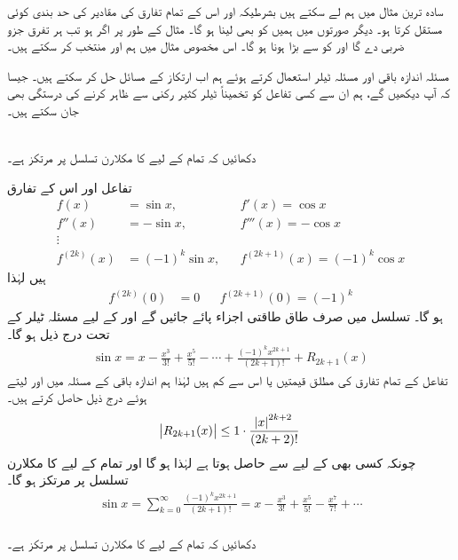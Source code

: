 سادہ ترین مثال میں ہم  لے سکتے ہیں بشرطیکہ  اور اس کے  تمام تفارق کی مقادیر کی حد  بندی کوئی مستقل   کرتا ہو۔ دیگر صورتوں میں ہمیں  کو بھی لینا ہو گا۔ مثال کے طور پر اگر  ہو تب ہر تفرق جزو ضربی  دے گا  اور  کو  سے بڑا  ہونا ہو گا۔ اس مخصوص مثال میں ہم  اور  منتخب کر سکتے ہیں۔

مسئلہ اندازہ باقی اور  مسئلہ ٹیلر استعمال کرتے ہوئے ہم اب ارتکاز کے مسائل حل کر سکتے ہیں۔ جیسا کہ  آپ دیکھیں گے، ہم ان سے کسی تفاعل کو تخمیناً ٹیلر کثیر رکنی سے ظاہر کرنے کی درستگی بھی جان سکتے ہیں۔

\\
دکھائیں کہ تمام  کے لیے  کا مکلارن تسلسل  پر مرتکز ہے۔

تفاعل اور اس کے تفارق
\begin{align*}
f(x)&=\sin x,&&f'(x)=\cos x\\
f''(x)&=-\sin x,&&f'''(x)=-\cos x\\
\vdots&\\
f^{(2k)}(x)&=(-1)^k\sin x,&&f^{(2k+1)}(x)=(-1)^k\cos x
\end{align*}
ہیں لہٰذا
\begin{align*}
f^{(2k)}(0)&=0&&f^{(2k+1)}(0)=(-1)^k
\end{align*}
ہو گا۔ تسلسل میں صرف طاق طاقتی اجزاء پائے جائیں گے اور  کے لیے مسئلہ ٹیلر کے تحت درج ذیل ہو گا۔
\begin{align*}
\sin x=x-\frac{x^3}{3!}+\frac{x^5}{5!}-\cdots+\frac{(-1)^kx^{2k+1}}{(2k+1)!}+R_{2k+1}(x)
\end{align*}
تفاعل  کے تمام تفارق کی مطلق قیمتیں  یا اس سے کم ہیں لہٰذا ہم اندازہ باقی کے مسئلہ میں  اور  لیتے ہوئے درج ذیل حاصل کرتے ہیں۔
\begin{align*}
\abs{R_{2k+1}(x)}\le 1\cdot\frac{\abs{x}^{2k+2}}{(2k+2)!}
\end{align*} 
چونکہ کسی بھی  کے لیے  سے  حاصل ہوتا ہے لہٰذا  ہو گا   اور تمام  کے لیے  کا مکلارن تسلسل  پر مرتکز ہو گا۔
\begin{align}
\sin x=\sum_{k=0}^{\infty}\frac{(-1)^kx^{2k+1}}{(2k+1)!}=x-\frac{x^3}{3!}+\frac{x^5}{5!}-\frac{x^7}{7!}+\cdots
\end{align}
\\
دکھائیں کہ تمام  کے لیے  کا مکلارن تسلسل  پر مرتکز ہے۔

